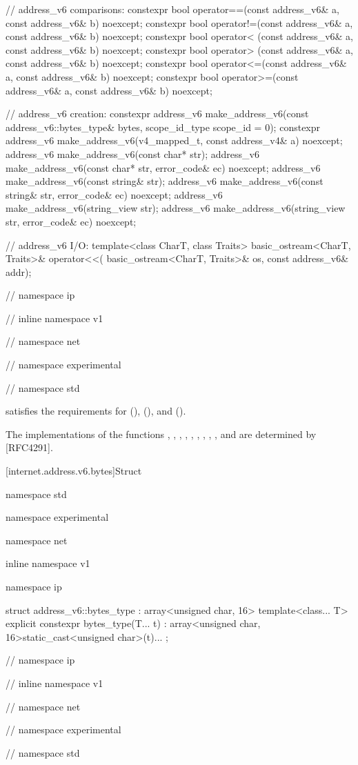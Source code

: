 \begin{codeblock}
{{{{{  // address_v6 comparisons:
  constexpr bool operator==(const address_v6& a, const address_v6& b) noexcept;
  constexpr bool operator!=(const address_v6& a, const address_v6& b) noexcept;
  constexpr bool operator< (const address_v6& a, const address_v6& b) noexcept;
  constexpr bool operator> (const address_v6& a, const address_v6& b) noexcept;
  constexpr bool operator<=(const address_v6& a, const address_v6& b) noexcept;
  constexpr bool operator>=(const address_v6& a, const address_v6& b) noexcept;

  // address_v6 creation:
  constexpr address_v6 make_address_v6(const address_v6::bytes_type& bytes,
                                       scope_id_type scope_id = 0);
  constexpr address_v6 make_address_v6(v4_mapped_t, const address_v4& a) noexcept;
  address_v6 make_address_v6(const char* str);
  address_v6 make_address_v6(const char* str, error_code& ec) noexcept;
  address_v6 make_address_v6(const string& str);
  address_v6 make_address_v6(const string& str, error_code& ec) noexcept;
  address_v6 make_address_v6(string_view str);
  address_v6 make_address_v6(string_view str, error_code& ec) noexcept;

  // address_v6 I/O:
  template<class CharT, class Traits>
    basic_ostream<CharT, Traits>& operator<<(
      basic_ostream<CharT, Traits>& os, const address_v6& addr);

} // namespace ip
} // inline namespace v1
} // namespace net
} // namespace experimental
} // namespace std
\end{codeblock}

\pnum
{} satisfies the requirements for  (),  (), and  ().

\pnum
\enternote The implementations of the functions , , , , , , , , ,  and  are determined by [RFC4291]. \exitnote


[internet.address.v6.bytes]{Struct }

\begin{codeblock}
namespace std {
namespace experimental {
namespace net {
inline namespace v1 {
namespace ip {

  struct address_v6::bytes_type : array<unsigned char, 16>
  {
    template<class... T> explicit constexpr bytes_type(T... t)
      : array<unsigned char, 16>{{static_cast<unsigned char>(t)...}} {}
  };

} // namespace ip
} // inline namespace v1
} // namespace net
} // namespace experimental
} // namespace std
\end{codeblock}

